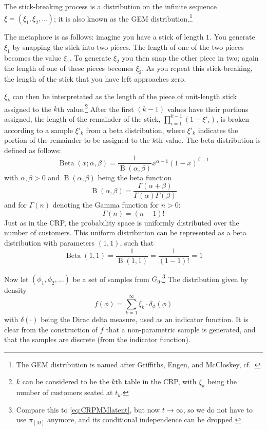 The stick-breaking process\cite{Ishwaran2001Gibbs} is a distribution on the infinite sequence  $\xi = (\xi_1,\xi_2,\ldots)$; it is also known as the GEM distribution.\footnote{The GEM distribution is named after Griffiths, Engen, and McCloskey, cf.\ \cite{Pitman1997The}}

The metaphore is as follows: imagine you have a stick of length $1$. You generate $\xi_1$ by snapping the stick into two pieces. The length of one of the two pieces becomes the value $\xi_1$. To generate $\xi_2$ you then snap the other piece in two; again the length of one of these pieces becomes $\xi_2$. As you repeat this stick-breaking, the length of the stick that you have left approaches zero.

$\xi_k$ can then be interpretated as the length of the piece of unit-length stick assigned to the $k$th value.\footnote{$k$ can be considered to be the $k$th table in the CRP, with $\xi_k$ being the number of customers seated at $t_k$.} After the first $(k-1)$ values have their portions assigned, the length of the remainder of the stick, $\prod_{i=1}^{k-1}(1-\xi'_i)$, is broken according to a sample $\xi'_k$ from a beta distribution, where $\xi'_k$ indicates the portion of the remainder to be assigned to the $k$th value. The beta distribution is defined as follows:
\begin{equation} 
	\operatorname{Beta}(x; \alpha, \beta) = \frac{1}{\operatorname{B}(\alpha,\beta)}x^{\alpha-1}(1-x)^{\beta-1}\label{eq:betad}
\end{equation}
with $\alpha,\beta >0$ and $\operatorname{B}(\alpha,\beta)$ being the beta function
\begin{equation}
	\operatorname{B}(\alpha,\beta) = \frac{\Gamma(\alpha+\beta)}{\Gamma(\alpha)\Gamma(\beta)}\label{eq:betaf}
\end{equation}
and for $\Gamma(n)$ denoting the Gamma function for $n>0$:
\begin{equation}
	\Gamma(n) = (n-1)!\label{eq:gammaf}
\end{equation}
Just as in the CRP, the probability space is uniformly distributed over the number of customers. This uniform distribution can be represented as a beta distribution with parameters $(1,1)$, such that 
\begin{equation}
	\operatorname{Beta}(1,1)=\frac{1}{\operatorname{B}(1,1)} = \frac{1}{(1-1)!} = 1
\end{equation}

Now let $(\phi_1, \phi_2, \ldots)$ be a set of samples from $G_0$.\footnote{Compare this to \cref{eq:CRPMMlatent}, but now $t\rightarrow\infty$, so we do not have to use $\pi_{[M]}$ anymore, and its conditional independence can be dropped.} The distribution given by density 
\begin{equation}
	f(\phi) = \sum_{k=1}^\infty \xi_k \cdot \delta_{\phi}(\phi) 
\end{equation}
with $\delta(\cdot)$ being the Dirac delta measure, used as an indicator function. It is clear from the construction of $f$ that a non-parametric sample is generated, and that the samples are discrete (from the indicator function).



